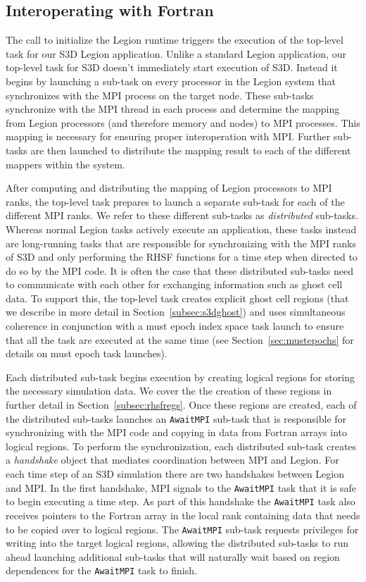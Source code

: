 \subsection{Interoperating with Fortran}
\label{subsec:interop}
The call to initialize the Legion runtime triggers
the execution of the top-level task for our S3D Legion 
application. Unlike a standard Legion application, our 
top-level task for S3D doesn't immediately start 
execution of S3D. Instead it begins by launching a
sub-task on every processor in the Legion system that 
synchronizes with the MPI process on the target node.
These sub-tasks synchronize with the MPI thread in
each process and determine the mapping from Legion
processors (and therefore memory and nodes) to MPI
processes. This mapping is necessary for ensuring 
proper interoperation with MPI. Further sub-tasks
are then launched to distribute the mapping result
to each of the different mappers within the system.

After computing and distributing the mapping of 
Legion processors to MPI ranks, the top-level task
prepares to launch a separate sub-task for each
of the different MPI ranks. We refer to these 
different sub-tasks as {\em distributed} sub-tasks.
Whereas normal Legion tasks actively execute an
application, these tasks instead are long-running
tasks that are responsible for synchronizing with
the MPI ranks of S3D and only performing the RHSF 
functions for a time step when directed to do so by 
the MPI code. It is often the case that these 
distributed sub-tasks need to communicate with each
other for exchanging information such as ghost
cell data. To support this, the top-level task
creates explicit ghost cell regions (that we describe
in more detail in Section~\ref{subsec:s3dghost}) and uses 
simultaneous coherence in conjunction with a must epoch 
index space task launch to ensure that all the task are 
executed at the same time (see 
Section~\ref{sec:mustepochs} for details on must
epoch task launches).

Each distributed sub-task begins execution by
creating logical regions for storing the necessary
simulation data. We cover the the creation of
these regions in further detail in 
Section~\ref{subsec:rhsfregs}. Once these regions
are created, each of the distributed sub-tasks
launches an {\tt AwaitMPI} sub-task that is 
responsible for synchronizing with the MPI code
and copying in data from Fortran arrays into
logical regions. To perform the synchronization,
each distributed sub-task creates a {\em handshake}
object that mediates coordination between MPI and
Legion. For each time step of an S3D simulation
there are two handshakes between Legion and MPI.
In the first handshake, MPI signals to the 
{\tt AwaitMPI} task that it is safe to begin
executing a time step. As part of this handshake
the {\tt AwaitMPI} task also receives pointers to
the Fortran array in the local rank containing data 
that needs to be copied over to logical regions.
The {\tt AwaitMPI} sub-task requests privileges 
for writing into the target logical regions, 
allowing the distributed sub-tasks to run ahead
launching additional sub-tasks that will naturally
wait based on region dependences for the
{\tt AwaitMPI} task to finish.

